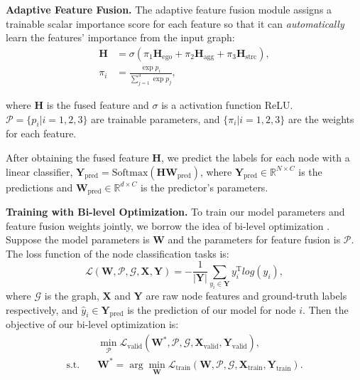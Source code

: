 \documentclass{article}
\theoremstyle{plain}
\begin{document}
\textbf{Adaptive Feature Fusion.}
The adaptive feature fusion module assigns a trainable scalar importance score for each feature so that it can \textit{automatically} learn the features' importance from the input graph: 
\begin{equation}
\begin{aligned}
\mathbf{H} &= \sigma(\pi_1 \mathbf{H}_\text{ego} + \pi_2 \mathbf{H}_\text{agg} + \pi_3 \mathbf{H}_\text{strc}), \\
\pi_i &= \frac{\exp{p_i}}{\sum_{j=1}^{3} \exp{p_j}},
\end{aligned}
\end{equation}

where $\mathbf{H}$ is the fused feature and $\sigma$ is a activation function ReLU. $\mathcal{P}=\{ p_i | i=1,2,3 \}$ are trainable parameters, and $\{ \pi_i | i=1,2,3\}$ are the weights for each feature.




After obtaining the fused feature $\mathbf{H}$, we predict the labels for each node with a linear classifier,
$\mathbf{Y}_\text{pred} = \text{Softmax}(\mathbf{H} \mathbf{W}_\text{pred})$, where $\mathbf{Y}_\text{pred} \in \mathbb{R}^{N \times C}$ is the predictions and $\mathbf{W}_\text{pred} \in \mathbb{R}^{d \times C}$ is the predictor's parameters.




\textbf{Training with Bi-level Optimization.}
To train our model parameters and feature fusion weights jointly, we borrow the idea of bi-level optimization \cite{liu2018darts,dong2019searching}. 
Suppose the model parameters is $\mathbf{W}$ and the parameters for feature fusion is $\mathcal{P}$. 
The loss function of the node classification tasks is:
\begin{equation}
  \mathcal{L}(\mathbf{W},\mathcal{P},\mathcal{G},\mathbf{X},\mathbf{Y}) = - \frac{1}{|\mathbf{Y}|} \sum_{y_i \in \mathbf{Y}} y_i^\text{T} log(\hat{y}_i),
\end{equation}
where $\mathcal{G}$ is the graph, $\mathbf{X}$ and $\mathbf{Y}$ are raw node features and ground-truth labels respectively, and $\hat{y}_i \in \mathbf{Y}_\text{pred}$ is the prediction of our model for node $i$. Then the objective of our bi-level optimization is:
\begin{equation}
\begin{aligned}
  &\min_{\mathcal{P}} \mathcal{L}_\text{valid}(\mathbf{W}^{*},\mathcal{P},\mathcal{G},\mathbf{X}_\text{valid},\mathbf{Y}_\text{valid}),\\
  \text{s.t.} \quad 
  &\mathbf{W}^{*} = \arg\min_{\mathbf{W}} \mathcal{L}_\text{train}(\mathbf{W},\mathcal{P},\mathcal{G},\mathbf{X}_\text{train},\mathbf{Y}_\text{train}).
\end{aligned}
\end{equation}
\end{document}
